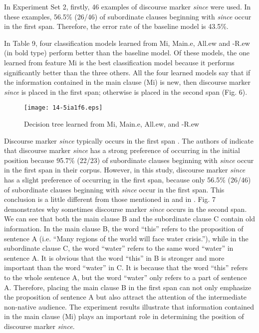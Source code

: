 \documentclass[english]{jnlp_1.3e}
\begin{document}
In Experiment Set 2, firstly, 46 examples of discourse marker \textit{since} 
were used. In these examples, 56.5\% (26/46) of subordinate clauses
beginning with \textit{since} occur in the first span.
Therefore, the error rate of the baseline model is 43.5\%. 

In Table 9, four classification models learned from Mi, Main.e, All.ew
and -R.ew (in bold type) perform better than the baseline model.
Of these models, the one learned from feature Mi is the best 
classification model because it performs significantly 
better than the three others. All the four learned models say that if 
the information contained in the main clause (Mi) is new, 
then discourse marker \textit{since} is placed 
in the first span; otherwise is placed in the second span (Fig. 6). 

\begin{table}[t]

\end{table}
\begin{figure}[t]
\begin{center}
\texttt{[image: 14-5ia1f6.eps]}
\end{center}
 \caption{Decision tree learned from Mi, Main.e, All.ew, and -R.ew}
\end{figure}

Discourse marker \textit{since} typically occurs in the first span \cite{Quirk72}. 
The authors of \cite{Moser95a} indicate that discourse marker \textit{since}
has a strong preference of occurring in the initial position because 
95.7\% (22/23) of subordinate clauses beginning with \textit{since} occur in the first
span in their corpus. However, in this study, discourse marker \textit{since}
has a slight preference of occurring in the first span, because only 56.5\% (26/46) 
of subordinate clauses beginning with \textit{since} occur in the first span. 
This conclusion is a little different from those mentioned in \cite{Quirk72} and 
in \cite{Moser95a}. Fig. 7 demonstrates why sometimes discourse
marker \textit{since} occurs in the second span. We can see that both 
the main clause B and the subordinate clause C contain old information.
In the main clause B, the word ``this'' refers to the proposition
of sentence A (i.e. ``Many regions of the world will face water crisis.''),
while in the subordinate clause C, the word ``water'' refers to the same word
``water'' in sentence A. It is obvious that the word ``this'' in B is stronger and
more important than the word ``water'' in C. It is because that the word ``this''
refers to the whole sentence A, but the word ``water'' only refers to a part
of sentence A. Therefore, placing the main clause B in the first span
can not only emphasize the proposition of sentence A but also attract
the attention of the intermediate non-native audience. 
The experiment results illustrate that information contained in the main clause (Mi)
plays an important role in determining the position of discourse 
marker \textit{since}.
\end{document}
